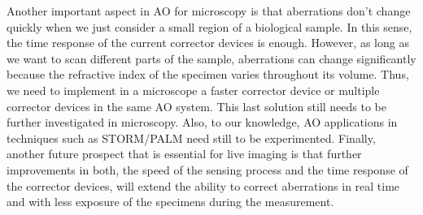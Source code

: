 Another important aspect in AO for microscopy is that aberrations don't change quickly when we just consider a small region of a biological sample. In this sense, the time response of the current corrector devices is enough. However, as long as we want to scan different parts of the sample, aberrations can change significantly because the refractive index of the specimen varies throughout its volume. Thus, we need to implement in a microscope a faster corrector device or multiple corrector devices in the same AO system. This last solution still needs to be further investigated in microscopy. Also, to our knowledge, AO applications in techniques such as STORM/PALM need still to be experimented. Finally, another future prospect that is essential for live imaging is that further improvements in both, the speed of the sensing process and the time response of the corrector devices, will extend the ability to correct aberrations in real time and with less exposure of the specimens during the measurement. 







